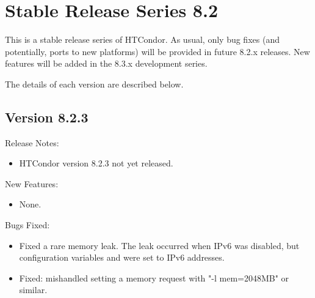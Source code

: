 
\section{\label{sec:History-8-2}Stable Release Series 8.2}

This is a stable release series of HTCondor.
As usual, only bug fixes (and potentially, ports to new platforms)
will be provided in future 8.2.x releases.
New features will be added in the 8.3.x development series.

The details of each version are described below.

\subsection*{\label{sec:New-8-2-3}Version 8.2.3}

\noindent Release Notes:

\begin{itemize}

\item HTCondor version 8.2.3 not yet released.

\end{itemize}


\noindent New Features:

\begin{itemize}

\item None.

\end{itemize}

\noindent Bugs Fixed:

\begin{itemize}

\item Fixed a rare memory leak. 
The leak occurred when IPv6 was disabled, 
but configuration variables  
and  were set to IPv6 addresses.

\item Fixed:  mishandled setting a memory request with "-l mem=2048MB" or similar.

\end{itemize}

